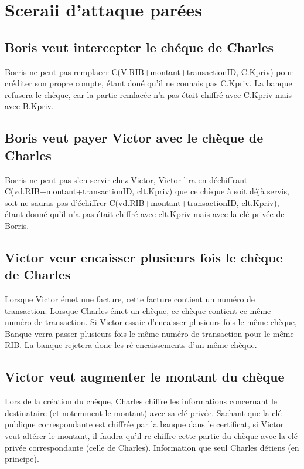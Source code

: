 \documentclass[oneside,10pt]{article}
\begin{document}
\section{Sceraii d'attaque par\'ees}

\subsection{Boris veut intercepter le ch\'eque de Charles}
Borris ne peut pas remplacer C(V.RIB+montant+transactionID, C.Kpriv) pour cr\'editer son propre compte, \'etant don\'e qu'il ne connais pas C.Kpriv.
La banque refusera le ch\`eque, car la partie remlac\'ee n'a pas \'etait chiffr\'e avec C.Kpriv mais avec B.Kpriv.

\subsection{Boris veut payer Victor avec le ch\`eque de Charles}
Borris ne peut pas s'en servir chez Victor, Victor lira en d\'echiffrant \\C(vd.RIB+montant+transactionID, clt.Kpriv) que ce ch\`eque \`a soit d\'ej\`a servis, soit ne sauras pas d'\'echiffrer C(vd.RIB+montant+transactionID, clt.Kpriv), \'etant donn\'e qu'il n'a pas \'etait chiffr\'e avec clt.Kpriv mais avec la cl\'e priv\'ee de Borris.

\subsection{Victor veur encaisser plusieurs fois le ch\`eque de Charles}
Lorsque Victor \'emet une facture, cette facture contient un num\'ero de transaction.
Lorsque Charles \'emet un ch\`eque, ce ch\`eque contient ce m\^eme num\'ero de transaction.
Si Victor essaie d'encaisser plusieurs fois le m\^eme ch\`eque, Banque verra passer plusieurs fois le m\^eme num\'ero de transaction pour le m\^eme RIB.
La banque rejetera donc les r\'e-encaissements d'un m\^eme ch\`eque.

\subsection{Victor veut augmenter le montant du ch\`eque}
Lors de la cr\'eation du ch\`eque, Charles chiffre les informations concernant le destinataire (et notemment le montant) avec sa cl\'e priv\'ee.
Sachant que la cl\'e publique correspondante est chiffr\'ee par la banque dans le certificat, si Victor veut alt\'erer le montant, il faudra qu'il re-chiffre cette partie du ch\`eque avec la cl\'e priv\'ee correspondante (celle de Charles).
Information que seul Charles d\'etiens (en principe).
\end{document}
